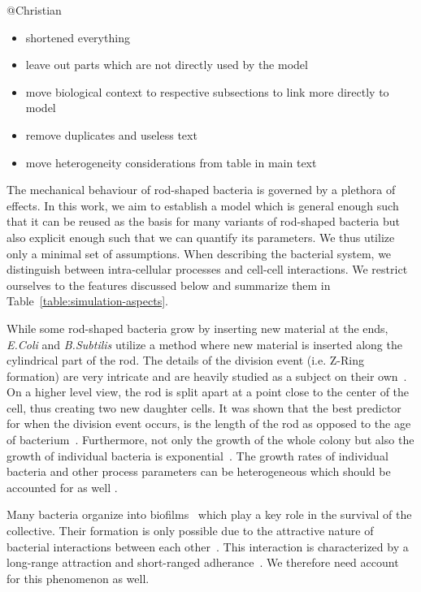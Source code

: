 \documentclass{article}
\begin{document}
@Christian
\begin{itemize}
    \item shortened everything
    \item leave out parts which are not directly used by the model
    \item move biological context to respective subsections to link more directly to model
    \item remove duplicates and useless text
    \item move heterogeneity considerations from table in main text
\end{itemize}

The mechanical behaviour of rod-shaped bacteria is governed by a plethora of effects.
In this work, we aim to establish a model which is general enough such that it can be reused as the
basis for many variants of rod-shaped bacteria but also explicit enough such that we can quantify
its parameters.
We thus utilize only a minimal set of assumptions.
When describing the bacterial system, we distinguish between intra-cellular processes and cell-cell
interactions.
We restrict ourselves to the features discussed below and summarize them in
Table~\ref{table:simulation-aspects}.

While some rod-shaped bacteria grow by inserting new material at the ends, \textit{E.Coli} and
\textit{B.Subtilis} utilize a method where new material is inserted along the cylindrical part of
the rod. The details of the division event (i.e. Z-Ring formation) are very intricate and are heavily
studied as a subject on their own~\cite{Harry2001}.
On a higher level view, the rod is split apart at a point close to the center of the cell, thus
creating two new daughter cells.
It was shown that the best predictor for when the division event occurs, is the length of the rod as
opposed to the age of bacterium~\cite{Robert2014}.
Furthermore, not only the growth of the whole colony but also the growth of individual bacteria is
exponential~\cite{Amir2014,Takeuchi2005}.
The growth rates of individual bacteria and other process parameters can be heterogeneous which
should be accounted for as well \cite{Koutsoumanis2013}.

Many bacteria organize into biofilms~\cite{Dunne2002,Ong1999} which play a key role in the survival
of the collective.
Their formation is only possible due to the attractive nature of bacterial interactions between
each other~\cite{Berne2018}.
This interaction is characterized by a long-range attraction and short-ranged
adherance~\cite{Verwey1947,Trejo2013}.
We therefore need account for this phenomenon as well.
\end{document}
